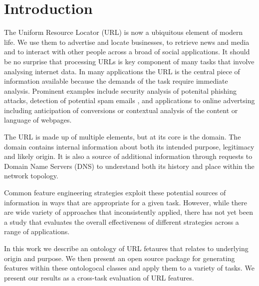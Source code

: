 \documentclass[sigconf]{acmart}
\begin{document}


\maketitle

\section{Introduction}

The Uniform Resource Locator (URL) is now a ubiquitous element of modern life. 
We use them to advertise and locate businesses, to retrieve news and media and 
to interact with other people across a broad of social applications. It should
be no surprise that processing URLs is key component of many tasks that involve
analysing internet data. In many applications the URL is the central piece of 
information available because the demands of the task require immediate analysis.
Prominent examples include security analysis of potenital phishing attacks\cite{Basnet2014}, 
detection of potential spam emails \cite{}, and applications to online advertsing
including anticipation of conversions \cite{Qiu2020} or contextual analysis of
the content\cite{Kan2005,Baykan2009} or language\cite{Baykan2013} of webpages. 

The URL is made up of multiple elements, but at its core is the domain. The domain
contains internal information about both its intended purpose, legitimacy and likely
origin. It is also a source of additional information through requests to Domain Name
Servers (DNS) to understand both its history and place within the network topology.

Common feature engineering strategies exploit these potential sources of information
in ways that are appropriate for a given task. However, while there are wide variety
of approaches that inconsistently applied, there has not yet been a study that evaluates
the overall effectiveness of different strategies across a range of applications.

In this work we describe an ontology of URL fetaures that relates to underlying origin
and purpose. We then present an open source package for generating features within these
ontologocal classes and apply them to a variety of tasks. We present our results as a
cross-task evaluation of URL features.  
\end{document}
